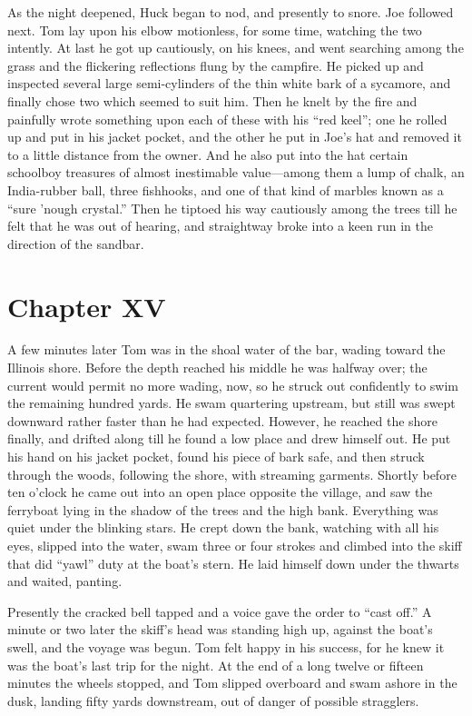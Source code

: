 \documentclass{book}
\begin{document}
As the night deepened, Huck began to nod, and presently to snore. Joe followed next. Tom lay upon his elbow motionless, for some time, watching the two intently. At last he got up cautiously, on his knees, and went searching among the grass and the flickering reflections flung by the campfire. He picked up and inspected several large semi-cylinders of the thin white bark of a sycamore, and finally chose two which seemed to suit him. Then he knelt by the fire and painfully wrote something upon each of these with his “red keel”; one he rolled up and put in his jacket pocket, and the other he put in Joe’s hat and removed it to a little distance from the owner. And he also put into the hat certain schoolboy treasures of almost inestimable value—among them a lump of chalk, an India-rubber ball, three fishhooks, and one of that kind of marbles known as a “sure ’nough crystal.” Then he tiptoed his way cautiously among the trees till he felt that he was out of hearing, and straightway broke into a keen run in the direction of the sandbar.

\chapter*{Chapter XV}

A few minutes later Tom was in the shoal water of the bar, wading toward the Illinois shore. Before the depth reached his middle he was halfway over; the current would permit no more wading, now, so he struck out confidently to swim the remaining hundred yards. He swam quartering upstream, but still was swept downward rather faster than he had expected. However, he reached the shore finally, and drifted along till he found a low place and drew himself out. He put his hand on his jacket pocket, found his piece of bark safe, and then struck through the woods, following the shore, with streaming garments. Shortly before ten o’clock he came out into an open place opposite the village, and saw the ferryboat lying in the shadow of the trees and the high bank. Everything was quiet under the blinking stars. He crept down the bank, watching with all his eyes, slipped into the water, swam three or four strokes and climbed into the skiff that did “yawl” duty at the boat’s stern. He laid himself down under the thwarts and waited, panting.

Presently the cracked bell tapped and a voice gave the order to “cast off.” A minute or two later the skiff’s head was standing high up, against the boat’s swell, and the voyage was begun. Tom felt happy in his success, for he knew it was the boat’s last trip for the night. At the end of a long twelve or fifteen minutes the wheels stopped, and Tom slipped overboard and swam ashore in the dusk, landing fifty yards downstream, out of danger of possible stragglers.
\end{document}
